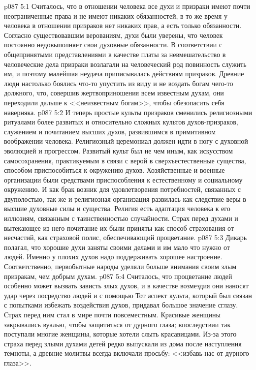 \vs p087 5:1 Считалось, что в отношении человека все духи и призраки имеют почти неограниченные права и не имеют никаких обязанностей, в то же время у человека в отношении призраков нет никаких прав, а есть только обязанности. Согласно существовавшим верованиям, духи были уверены, что человек постоянно недовыполняет свои духовные обязанности. В соответствии с общепринятыми представлениями в качестве платы за невмешательство в человеческие дела призраки возлагали на человеческий род повинность служить им, и поэтому малейшая неудача приписывалась действиям призраков. Древние люди настолько боялись что\hyp{}то упустить из виду и не воздать богам чего\hyp{}то должного, что, совершив жертвоприношения всем известным духам, они переходили дальше к <<неизвестным богам>>, чтобы обезопасить себя наверняка.
\vs p087 5:2 И теперь простые культы призраков сменились религиозными ритуалами более развитых и относительно сложных культов духов\hyp{}призраков, служением и почитанием высших духов, развившимся в примитивном воображении человека. Религиозный церемониал должен идти в ногу с духовной эволюцией и прогрессом. Развитый культ был не чем иным, как искусством самосохранения, практикуемым в связи с верой в сверхъестественные существа, способом приспособиться к окружению духов. Хозяйственные и военные организации были средствами приспособления к естественному и социальному окружению. И как брак возник для удовлетворения потребностей, связанных с двуполостью, так же и религиозная организация развилась как следствие веры в высшие духовные силы и существа. Религия есть адаптация человека к его иллюзиям, связанным с таинственностью случайности. Страх перед духами и вытекающее из него почитание их были приняты как способ страхования от несчастий, как страховой полис, обеспечивающий процветание.
\vs p087 5:3 Дикарь полагал, что хорошие духи заняты своими делами и им мало что нужно от людей. Именно у плохих духов надо поддерживать хорошее настроение. Соответственно, первобытные народы уделяли больше внимания своим злым призракам, чем добрым духам.
\vs p087 5:4 Считалось, что процветание людей особенно может вызвать зависть злых духов, и в качестве возмездия они наносят удар через посредство людей и с помощью  Тот аспект культа, который был связан с попытками избежать воздействия духов, придавал большое значение сглазу. Страх перед ним стал в мире почти повсеместным. Красивые женщины закрывались вуалью, чтобы защититься от дурного глаза; впоследствии так поступали многие женщины, которые хотели слыть красавицами. Из\hyp{}за этого страха перед злыми духами детей редко выпускали из дома после наступления темноты, а древние молитвы всегда включали просьбу: <<избавь нас от дурного глаза>>.
